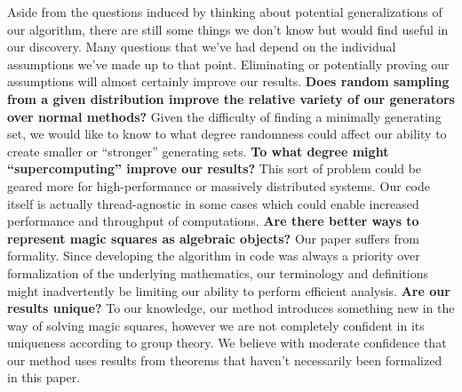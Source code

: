 \documentclass[12pt]{report}
\begin{document}
\indent Aside from the questions induced by thinking about potential generalizations of our
algorithm,
there are still some things we don't know but would find useful in our discovery. Many questions
that we've had depend on the individual assumptions we've made up to that point. Eliminating or
potentially proving our assumptions will almost certainly improve our results.
\linebreak
\linebreak
\textbf{Does random sampling from a given distribution improve the relative variety of our
  generators over normal methods?} Given the difficulty of finding a minimally generating set, we
would like to know to what degree randomness could affect our ability to create smaller or
``stronger'' generating sets.
\linebreak
\linebreak
\textbf{To what degree might ``supercomputing'' improve our results?} This sort of problem could be
geared more for high-performance or massively distributed systems. Our code itself is actually
thread-agnostic in some cases which could enable increased performance and throughput of
computations.
\linebreak
\linebreak
\textbf{Are there better ways to represent magic squares as algebraic objects?} Our paper suffers
from formality. Since developing the algorithm in code was always a priority over formalization of
the underlying mathematics, our terminology and definitions might inadvertently be limiting our
ability to perform efficient analysis.
\linebreak
\linebreak
\textbf{Are our results unique?} To our knowledge, our method introduces something new in the way
of solving magic squares, however we are not completely confident in its uniqueness according to
group theory. We believe with moderate confidence that our method uses results from theorems that
haven't necessarily been formalized in this paper.

\nocite{*}
\printbibliography{}
\end{document}
